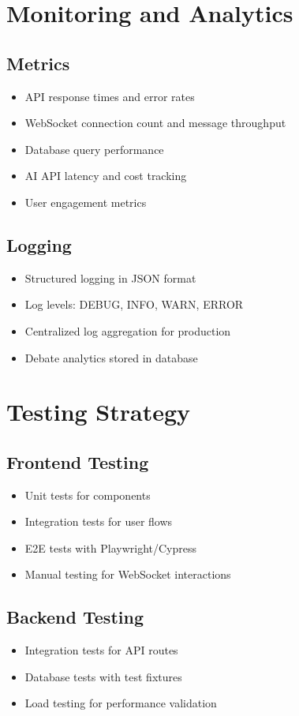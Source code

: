 \section{Monitoring and Analytics}

\subsection{Metrics}
\begin{itemize}
    \item API response times and error rates
    \item WebSocket connection count and message throughput
    \item Database query performance
    \item AI API latency and cost tracking
    \item User engagement metrics
\end{itemize}

\subsection{Logging}
\begin{itemize}
    \item Structured logging in JSON format
    \item Log levels: DEBUG, INFO, WARN, ERROR
    \item Centralized log aggregation for production
    \item Debate analytics stored in database
\end{itemize}

\section{Testing Strategy}

\subsection{Frontend Testing}
\begin{itemize}
    \item Unit tests for components
    \item Integration tests for user flows
    \item E2E tests with Playwright/Cypress
    \item Manual testing for WebSocket interactions
\end{itemize}

\subsection{Backend Testing}
\begin{itemize}
    \item Integration tests for API routes
    \item Database tests with test fixtures
    \item Load testing for performance validation
\end{itemize}

